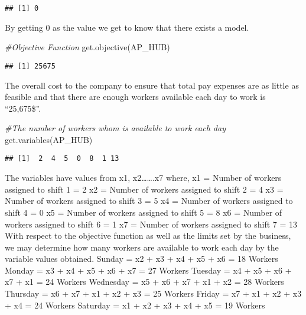 \documentclass[
]{article}
\newenvironment{Shaded}{\begin{snugshade}}{\end{snugshade}}
\newcommand{\CommentTok}[1]{\textcolor[rgb]{0.56,0.35,0.01}{\textit{#1}}}
\newcommand{\FunctionTok}[1]{\textcolor[rgb]{0.00,0.00,0.00}{#1}}
\newcommand{\NormalTok}[1]{#1}
\begin{document}
\begin{verbatim}
## [1] 0
\end{verbatim}

By getting 0 as the value we get to know that there exists a model.

\begin{Shaded}
\begin{Highlighting}[]
\CommentTok{\#Objective Function}
\FunctionTok{get.objective}\NormalTok{(AP\_HUB)}
\end{Highlighting}
\end{Shaded}

\begin{verbatim}
## [1] 25675
\end{verbatim}

The overall cost to the company to ensure that total pay expenses are as
little as feasible and that there are enough workers available each day
to work is ``25,675\$''.

\begin{Shaded}
\begin{Highlighting}[]
\CommentTok{\#The number of workers whom is available to work each day}
\FunctionTok{get.variables}\NormalTok{(AP\_HUB)}
\end{Highlighting}
\end{Shaded}

\begin{verbatim}
## [1]  2  4  5  0  8  1 13
\end{verbatim}

The variables have values from x1, x2\ldots\ldots.x7 where, x1 = Number
of workers assigned to shift 1 = 2 x2 = Number of workers assigned to
shift 2 = 4 x3 = Number of workers assigned to shift 3 = 5 x4 = Number
of workers assigned to shift 4 = 0 x5 = Number of workers assigned to
shift 5 = 8 x6 = Number of workers assigned to shift 6 = 1 x7 = Number
of workers assigned to shift 7 = 13 With respect to the objective
function as well as the limits set by the business, we may determine how
many workers are available to work each day by the variable values
obtained. Sunday = x2 + x3 + x4 + x5 + x6 = 18 Workers Monday = x3 + x4
+ x5 + x6 + x7 = 27 Workers Tuesday = x4 + x5 + x6 + x7 + x1 = 24
Workers Wednesday = x5 + x6 + x7 + x1 + x2 = 28 Workers Thursday = x6 +
x7 + x1 + x2 + x3 = 25 Workers Friday = x7 + x1 + x2 + x3 + x4 = 24
Workers Saturday = x1 + x2 + x3 + x4 + x5 = 19 Workers
\end{document}
